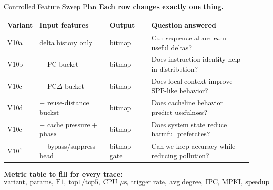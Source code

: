 \documentclass[10pt,aspectratio=169]{beamer}
\begin{document}
\begin{frame}{Controlled Feature Sweep Plan}
  \textbf{Each row changes exactly one thing.}

  \vspace{0.4em}
  \begin{center}
  \scriptsize
  \begin{tabular}{llll}
    \toprule
    \textbf{Variant} & \textbf{Input features} & \textbf{Output} & \textbf{Question answered} \\
    \midrule
    V10a & delta history only & bitmap & Can sequence alone learn useful deltas? \\
    V10b & + PC bucket & bitmap & Does instruction identity help in-distribution? \\
    V10c & + PC$\Delta$ bucket & bitmap & Does local context improve SPP-like behavior? \\
    V10d & + reuse-distance bucket & bitmap & Does cacheline behavior predict usefulness? \\
    V10e & + cache pressure + phase & bitmap & Does system state reduce harmful prefetches? \\
    V10f & + bypass/suppress head & bitmap + gate & Can we keep accuracy while reducing pollution? \\
    \bottomrule
  \end{tabular}
  \end{center}

  \vspace{0.5em}
  \textbf{Metric table to fill for every trace:}
  \[
  \text{variant},\ \text{params},\ \text{F1},\ \text{top1/top5},\
  \text{CPU $\mu$s},\ \text{trigger rate},\ \text{avg degree},\
  \text{IPC},\ \text{MPKI},\ \text{speedup}
  \]
\end{frame}
\end{document}
